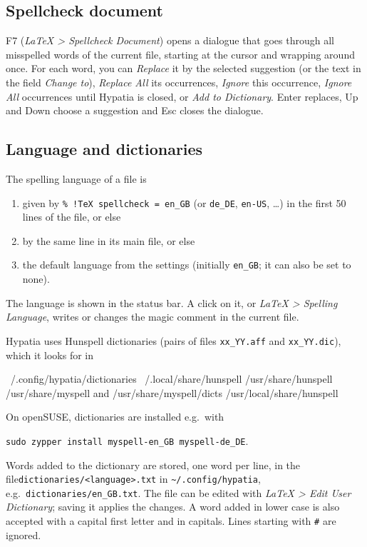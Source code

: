 \documentclass[11pt]{article}
\newcommand{\key}[1]{\textsf{#1}}
\newcommand{\menu}[1]{\textsf{\textit{#1}}}
\newcommand{\file}[1]{\texttt{#1}}
\newcommand{\cfgdir}{\texttt{\textasciitilde/.config/hypatia}}
\begin{document}
    \subsection{Spellcheck document}

    \key{F7} (\menu{LaTeX > Spellcheck Document}) opens a dialogue that goes through all misspelled words of the current file, starting at the cursor and wrapping around once. For each word, you can \emph{Replace} it by the selected suggestion (or the text in the field \emph{Change to}), \emph{Replace All} its occurrences, \emph{Ignore} this occurrence, \emph{Ignore All} occurrences until Hypatia is closed, or \emph{Add to Dictionary}. \key{Enter} replaces, \key{Up} and \key{Down} choose a suggestion and \key{Esc} closes the dialogue.

    \subsection{Language and dictionaries}

    The spelling language of a file is
    \begin{enumerate}
        \itemsep-1mm
        \item given by \verb+% !TeX spellcheck = en_GB+ (or \verb+de_DE+, \verb+en-US+, \ldots) in the first 50 lines of the file, or else
        \item by the same line in its main file, or else
        \item the default language from the settings (initially \verb+en_GB+; it can also be set to none).
    \end{enumerate}
    The language is shown in the status bar. A click on it, or \menu{LaTeX > Spelling Language}, writes or changes the magic comment in the current file.

    Hypatia uses Hunspell dictionaries (pairs of files \verb+xx_YY.aff+ and \verb+xx_YY.dic+), which it looks for in
    \begin{Code}
~/.config/hypatia/dictionaries
~/.local/share/hunspell
/usr/share/hunspell
/usr/share/myspell  and  /usr/share/myspell/dicts
/usr/local/share/hunspell
    \end{Code}
    On openSUSE, dictionaries are installed e.g.\ with 
    \begin{center}
        \verb+sudo zypper install myspell-en_GB myspell-de_DE+.
    \end{center}

    Words added to the dictionary are stored, one word per line, in the file\linebreak \file{dictionaries/<language>.txt} in \cfgdir, e.g.\ \file{dictionaries/en\_GB.txt}. The file can be edited with \menu{LaTeX > Edit User Dictionary}; saving it applies the changes. A word added in lower case is also accepted with a capital first letter and in capitals. Lines starting with \verb+#+ are ignored.
\end{document}
